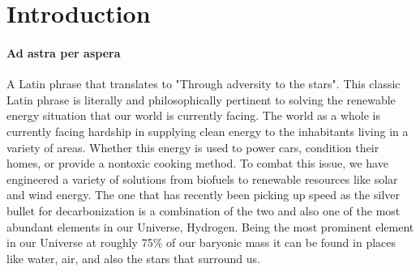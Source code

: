 \documentclass[3p,sort]{elsarticle}
\begin{document}


\section{Introduction}
\paragraph{Ad astra per aspera} A Latin phrase that translates to "Through adversity to the stars".
 This classic Latin phrase is literally and philosophically pertinent to solving the renewable 
 energy situation that our world is currently facing. The world as a whole is currently facing 
 hardship in supplying clean energy to the inhabitants living in a variety of areas. Whether 
 this energy is used to power cars, condition their homes, or provide a 
nontoxic cooking method. To combat this issue, we have engineered a variety of solutions from 
biofuels to renewable resources like solar and wind energy. The one that has recently been picking
 up speed as the silver bullet for decarbonization is a combination of the two and also one 
 of the most abundant elements in our Universe, Hydrogen. Being the most prominent element in 
 our Universe at roughly 75\% of our baryonic mass it can be found in places like water, air, 
 and also the stars that surround us.  \cite{forbes}
\end{document}

